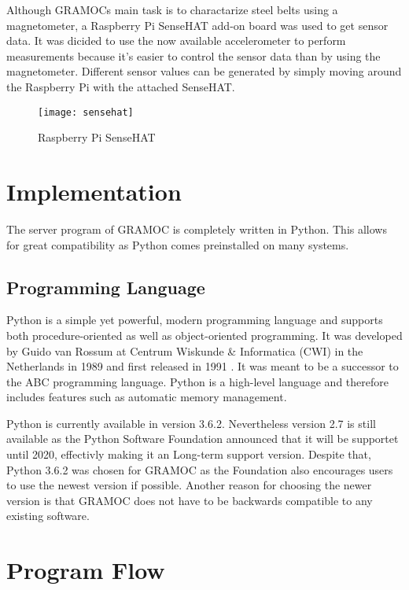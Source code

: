 Although GRAMOCs main task is to charactarize steel belts using a magnetometer, a Raspberry Pi SenseHAT add-on board was used to get sensor data. It was dicided to use the now available accelerometer to perform measurements because it's easier to control the sensor data than by using the magnetometer. Different sensor values can be generated by simply moving around the Raspberry Pi with the attached SenseHAT.

\begin{figure}[H]
	\centering
	\texttt{[image: sensehat]}
	\caption{Raspberry Pi SenseHAT \autocite{img:sensehat}}
	\label{fig:sensehat}
\end{figure}

\section{Implementation}

The server program of GRAMOC is completely written in Python. This allows for great compatibility as Python comes preinstalled on many systems.

\subsection{Programming Language}

Python is a simple yet powerful, modern programming language and supports both procedure-oriented as well as object-oriented programming. It was developed by Guido van Rossum at Centrum Wiskunde \& Informatica (CWI) in the Netherlands in 1989 and first released in 1991 \autocite{HistoryOfPython}. It was meant to be a successor to the ABC programming language. Python is a high-level language and therefore includes features such as automatic memory management.

Python is currently available in version 3.6.2. Nevertheless version 2.7 is still available as the Python Software Foundation announced that it will be supportet until 2020, effectivly making it an Long-term support version. Despite that, Python 3.6.2 was chosen for GRAMOC as the Foundation also encourages users to use the newest version if possible. Another reason for choosing the newer version is that GRAMOC does not have to be backwards compatible to any existing software.

\section{Program Flow}

